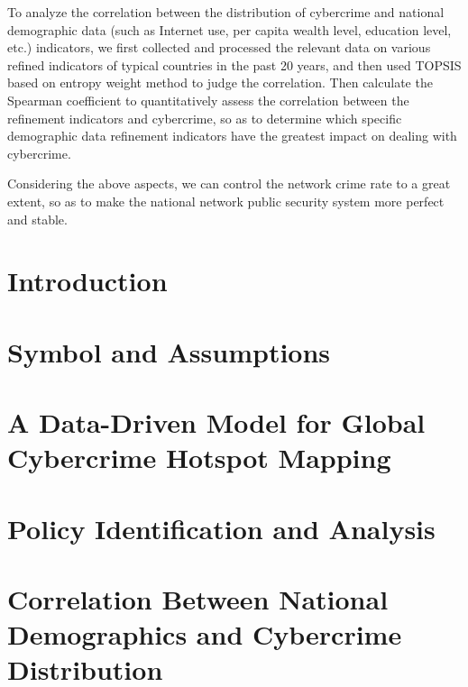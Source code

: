 \documentclass[12pt]{article}
\begin{document}
\begin{adjustwidth}{2em}{2em}
	To analyze the correlation between the distribution of cybercrime and national demographic data
	(such as Internet use, per capita wealth level, education level, etc.) indicators,
	we first collected and processed the relevant data on various refined indicators of typical countries in the past 20 years,
	and then used TOPSIS based on entropy weight method to judge the correlation.
	Then calculate the Spearman coefficient to quantitatively assess the correlation between the refinement indicators and cybercrime,
	so as to determine which specific demographic data refinement indicators have the greatest impact on dealing with cybercrime.

	Considering the above aspects, we can control the network crime rate to a great extent,
	so as to make the national network public security system more perfect and stable.
\end{adjustwidth}

\newpage
\tableofcontents
\newpage

\section{Introduction}\label{sec:introduction}

\section{Symbol and Assumptions}\label{sec:symbol-and-assumptions}

\section{A Data-Driven Model for Global Cybercrime Hotspot Mapping}
\label{sec:a-data-driven-model-for-global-cybercrime-hotspot-mapping}

\section{Policy Identification and Analysis}\label{sec:policy-identification-and-analysis}

\section{Correlation Between National Demographics and Cybercrime Distribution}
\label{sec:correlation-between-national-demographics-and-cybercrime-distribution}
\end{document}
